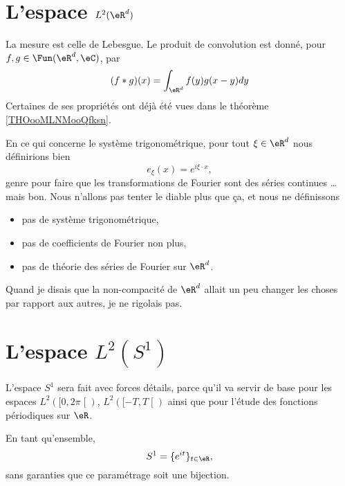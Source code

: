 \section{L'espace \( L^2(\eR^d)\)}

La mesure est celle de Lebesgue. Le produit de convolution est donné, pour \( f,g\in\Fun(\eR^d,\eC)\), par
\begin{equation}
	(f*g)(x)=\int_{\eR^d}f(y)g(x-y)dy
\end{equation}
Certaines de ses propriétés ont déjà été vues dans le théorème \ref{THOooMLNMooQfksn}.

En ce qui concerne le système trigonométrique, pour tout \( \xi\in \eR^d\) nous définirions bien
\begin{equation}
	e_{\xi}(x)= e^{i\xi\cdot x},
\end{equation}
genre pour faire que les transformations de Fourier sont des séries continues \ldots mais bon. Nous n'allons pas tenter le diable plus que ça, et nous ne définissons
\begin{itemize}
	\item pas de système trigonométrique,
	\item pas de coefficients de Fourier non plus,
	\item pas de théorie des séries de Fourier sur \( \eR^d\).
\end{itemize}
Quand je disais que la non-compacité de \( \eR^d\) allait un peu changer les choses par rapport aux autres, je ne rigolais pas.

\section{L'espace \( L^2(S^1)\)}

L'espace \( S^1\) sera fait avec forces détails, parce qu'il va servir de base pour les espaces \( L^2(\mathopen[ 0 , 2\pi \mathclose[)\), \( L^2(\mathopen[ -T , T \mathclose[)\) ainsi que pour l'étude des fonctions périodiques sur \( \eR\).

En tant qu'ensemble,
\begin{equation}
	S^1=\{  e^{it} \}_{t\in \eR},
\end{equation}
sans garanties que ce paramétrage soit une bijection.

